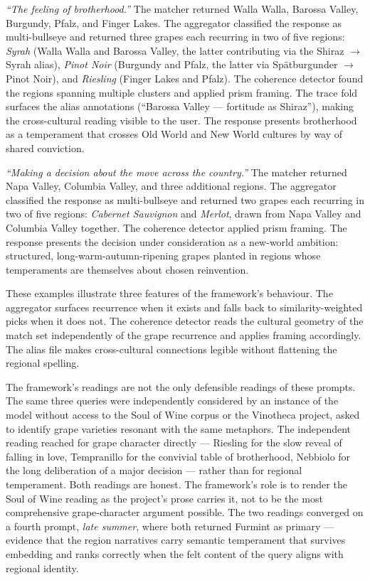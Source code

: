 \documentclass[11pt]{article}
\begin{document}
\emph{``The feeling of brotherhood.''} The matcher returned Walla Walla, Barossa Valley, Burgundy, Pfalz, and Finger Lakes. The aggregator classified the response as multi-bullseye and returned three grapes each recurring in two of five regions: \emph{Syrah} (Walla Walla and Barossa Valley, the latter contributing via the Shiraz $\rightarrow$ Syrah alias), \emph{Pinot Noir} (Burgundy and Pfalz, the latter via Spätburgunder $\rightarrow$ Pinot Noir), and \emph{Riesling} (Finger Lakes and Pfalz). The coherence detector found the regions spanning multiple clusters and applied prism framing. The trace fold surfaces the alias annotations (``Barossa Valley --- fortitude \textperiodcentered{} as Shiraz''), making the cross-cultural reading visible to the user. The response presents brotherhood as a temperament that crosses Old World and New World cultures by way of shared conviction.

\emph{``Making a decision about the move across the country.''} The matcher returned Napa Valley, Columbia Valley, and three additional regions. The aggregator classified the response as multi-bullseye and returned two grapes each recurring in two of five regions: \emph{Cabernet Sauvignon} and \emph{Merlot}, drawn from Napa Valley and Columbia Valley together. The coherence detector applied prism framing. The response presents the decision under consideration as a new-world ambition: structured, long-warm-autumn-ripening grapes planted in regions whose temperaments are themselves about chosen reinvention.

These examples illustrate three features of the framework's behaviour. The aggregator surfaces recurrence when it exists and falls back to similarity-weighted picks when it does not. The coherence detector reads the cultural geometry of the match set independently of the grape recurrence and applies framing accordingly. The alias file makes cross-cultural connections legible without flattening the regional spelling.

The framework's readings are not the only defensible readings of these prompts. The same three queries were independently considered by an instance of the model without access to the Soul of Wine corpus or the Vinotheca project, asked to identify grape varieties resonant with the same metaphors. The independent reading reached for grape character directly --- Riesling for the slow reveal of falling in love, Tempranillo for the convivial table of brotherhood, Nebbiolo for the long deliberation of a major decision --- rather than for regional temperament. Both readings are honest. The framework's role is to render the Soul of Wine reading as the project's prose carries it, not to be the most comprehensive grape-character argument possible. The two readings converged on a fourth prompt, \emph{late summer}, where both returned Furmint as primary --- evidence that the region narratives carry semantic temperament that survives embedding and ranks correctly when the felt content of the query aligns with regional identity.
\end{document}
